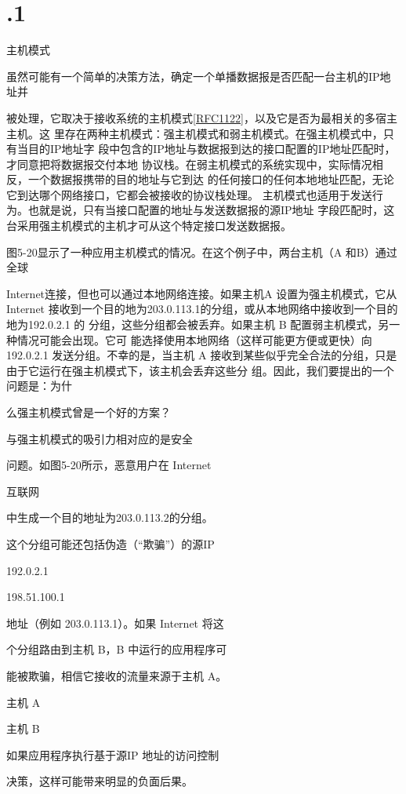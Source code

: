 \section{.1}
主机模式

虽然可能有一个简单的决策方法，确定一个单播数据报是否匹配一台主机的IP地址并

被处理，它取决于接收系统的主机模式\href{https://www.rfc-editor.org/rfc/rfc1122}{[RFC1122]}，以及它是否为最相关的多宿主主机。这
里存在两种主机模式：强主机模式和弱主机模式。在强主机模式中，只有当目的IP地址字
段中包含的IP地址与数据报到达的接口配置的IP地址匹配时，才同意把将数据报交付本地
协议栈。在弱主机模式的系统实现中，实际情况相反，一个数据报携带的目的地址与它到达
的任何接口的任何本地地址匹配，无论它到达哪个网络接口，它都会被接收的协议栈处理。
主机模式也适用于发送行为。也就是说，只有当接口配置的地址与发送数据报的源IP地址
字段匹配时，这台采用强主机模式的主机才可从这个特定接口发送数据报。

图5-20显示了一种应用主机模式的情况。在这个例子中，两台主机（A 和B）通过全球

Internet连接，但也可以通过本地网络连接。如果主机A 设置为强主机模式，它从 Internet
接收到一个目的地为203.0.113.1的分组，或从本地网络中接收到一个目的地为192.0.2.1 的
分组，这些分组都会被丢弃。如果主机 B 配置弱主机模式，另一种情况可能会出现。它可
能选择使用本地网络（这样可能更方便或更快）向192.0.2.1 发送分组。不幸的是，当主机 A
接收到某些似乎完全合法的分组，只是由于它运行在强主机模式下，该主机会丢弃这些分
组。因此，我们要提出的一个问题是：为什

么强主机模式曾是一个好的方案？

与强主机模式的吸引力相对应的是安全

问题。如图5-20所示，恶意用户在 Internet

互联网

中生成一个目的地址为203.0.113.2的分组。

这个分组可能还包括伪造（“欺骗”）的源IP

192.0.2.1

198.51.100.1

地址（例如 203.0.113.1）。如果 Internet 将这

个分组路由到主机 B，B 中运行的应用程序可

能被欺骗，相信它接收的流量来源于主机 A。

主机 A

主机 B

如果应用程序执行基于源IP 地址的访问控制

决策，这样可能带来明显的负面后果。

